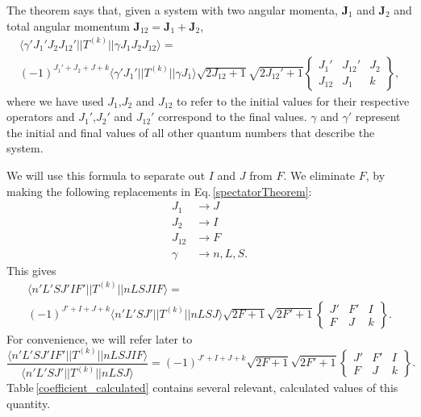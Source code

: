 The theorem says that, given a system with two angular momenta, $\mathbf{J}_1$ and $\mathbf{J}_2$ and total angular momentum $\mathbf{J}_{12}=\mathbf{J}_1+\mathbf{J}_2$,
\begin{multline}\label{spectatorTheorem}
\langle\gamma' J_1'J_2J_{12}'||T^{(k)}||\gamma J_1 J_2 J_{12}\rangle=
\\(-1)^{J_1'+J_2+J+k}\langle\gamma'J_1'||T^{(k)}||\gamma J_1\rangle
\sqrt{2J_{12}+1}\sqrt{2J_{12}'+1}
\begin{Bmatrix}
J_1' & J_{12}' & J_2 \\
J_{12} & J_1 & k
\end{Bmatrix},
\end{multline}
where we have used $J_{1}$,$J_{2}$ and $J_{12}$ to refer to the initial values for their respective operators and $J_{1}'$,$J_{2}'$ and $J_{12}'$ correspond to the final values. $\gamma$ and $\gamma'$ represent the initial and final values of all other quantum numbers that describe the system.

We will use this formula to separate out $I$ and $J$ from $F$.
We eliminate $F$, by making the following replacements in Eq.\,\ref{spectatorTheorem}:
\begin{align}
J_1&\rightarrow J\\
J_2&\rightarrow I\\
J_{12}&\rightarrow F\\
\gamma &\rightarrow  n,L,S.
\end{align}
This gives 
\begin{multline}\label{spectatorTheorem1}
\langle n' L' S J' I F'||T^{(k)}||n L S J I F\rangle=
\\(-1)^{J'+I+J+k}\langle n'L' S J'||T^{(k)}|| n L S J\rangle
\sqrt{2F+1}\sqrt{2F'+1}
\begin{Bmatrix}
J' & F' & I \\
F & J & k
\end{Bmatrix}.
\end{multline}
For convenience, we will refer later to 
\begin{equation}
\frac{\langle n' L' S J' I F'||T^{(k)}||n L S J I F\rangle}{\langle n'L' S J'||T^{(k)}|| n L S J\rangle}=(-1)^{J'+I+J+k}\sqrt{2F+1}\sqrt{2F'+1}
\begin{Bmatrix}
J' & F' & I \\
F & J & k
\end{Bmatrix}.
\label{afterSpectators}
\end{equation} 
Table\,\ref{coefficient_calculated} contains several relevant, calculated values of this quantity.

